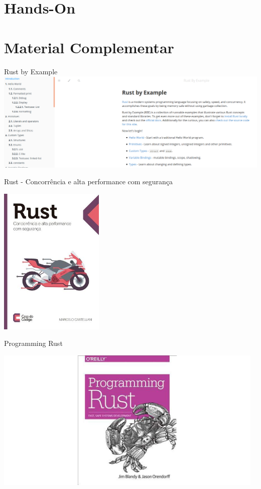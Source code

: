 \documentclass[aspectratio=169]{beamer}
\begin{document}
\section{Hands-On}

\section{Material Complementar}

\begin{frame}{Rust by Example}
	\includegraphics[width=15.0cm]{imgs/rust-by-example.png}	
\end{frame}

\begin{frame}{Rust - Concorrência e alta performance com segurança}
	\begin{center}
		\includegraphics[width=5.0cm]{imgs/casa-do-codigo-rust.jpg}	
	\end{center}
\end{frame}

\begin{frame}{Programming Rust}
	\begin{center}
		\includegraphics[width=13.0cm]{imgs/programming-rust.jpg}	
	\end{center}
\end{frame}
\end{document}
